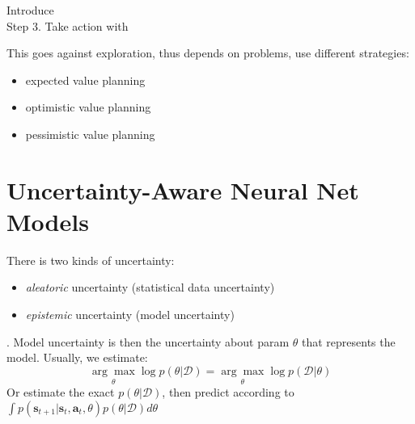  Introduce \\
Step 3. Take action with 

This goes against exploration, thus depends on problems, use different strategies:
\begin{itemize}
	\item expected value planning
	\item optimistic value planning
	\item pessimistic value planning
\end{itemize}

\section{Uncertainty-Aware Neural Net Models}
There is two kinds of uncertainty:
\begin{itemize}
	\item \textit{aleatoric} uncertainty (statistical data uncertainty)
	\item \textit{epistemic} uncertainty (model uncertainty)
\end{itemize}
. Model uncertainty is then the uncertainty about \ac{param} $\theta$ that represents the model. Usually, we estimate:
\[ \underset{\theta}{\arg\max} \log p(\theta| \mathcal{D}) = \underset{\theta}{\arg\max} \log p(\mathcal{D} | \theta) \]
Or estimate the exact $p(\theta| \mathcal{D})$, then predict according to $\displaystyle \int p(\textbf{s}_{t+1} | \textbf{s}_t, \textbf{a}_t, \theta) p(\theta|\mathcal{D}) d\theta$

